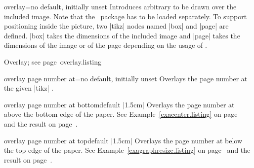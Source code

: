 \documentclass[a4paper,11pt]{ltxdoc}
\begin{document}
\begin{docIgrKey}{overlay}{=}{no default, initially unset}
  Introduces arbitrary  to be drawn over the included image.
  Note that the \tikzname\ package \cite{package:tikz} has to be loaded separately.
  To support positioning inside the picture, two |tikz| nodes named
  |box| and |page| are defined. |box| takes the dimensions of the included image
  and |page| takes the dimensions of the image or of the page depending on the usage of
  .
\begin{texexptitled}%
  {Overlay; see page~\pageref{overlay}}{overlay.listing}
\end{texexptitled}
\end{docIgrKey}

\begin{docIgrKey}{overlay page number at}{=}{no default, initially unset}
  Overlays the page number at the given |tikz| .
\end{docIgrKey}

\begin{docIgrKey}{overlay page number at bottom}{}{default |1.5cm|}
  Overlays the page number at  above the bottom edge of the paper.
  See Example~\ref{exacenter.listing} on page~\pageref{exacenter.listing}
  and the result on page~\pageref{exacenter}.
\end{docIgrKey}

\begin{docIgrKey}{overlay page number at top}{}{default |1.5cm|}
  Overlays the page number at  below the top edge of the paper.
  See Example~\ref{exagraphresize.listing} on page~\pageref{exagraphresize.listing}
  and the result on page~\pageref{exagraphresize}.
\end{docIgrKey}
\end{document}
